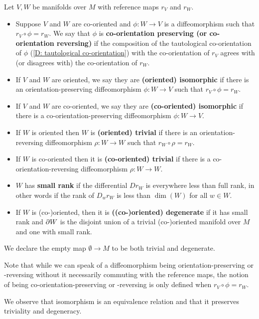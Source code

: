 \begin{definition}\label{D: equiv triv and small}
	Let $V, W$ be manifolds over $M$ with reference maps $r_V$ and $r_W$.
	\begin{itemize}
		\item Suppose $V$ and $W$ are co-oriented and $\phi \colon W \to V$ is a diffeomorphism such that $r_V \circ \phi = r_W$.
		We say that $\phi$ is \textbf{co-orientation preserving (or co-orientation reversing)} if the composition of the tautological co-orientation of $\phi$ (\cref{D: tautological co-orientation}) with the co-orientation of $r_V$ agrees with (or disagrees with) the co-orientation of $r_W$.
		\item If $V$ and $W$ are oriented, we say they are \textbf{(oriented) isomorphic} if there is an orientation-preserving diffeomorphism $\phi \colon W \to V$ such that $r_V \circ \phi = r_W$.
		\item If $V$ and $W$ are co-oriented, we say they are \textbf{(co-oriented) isomorphic} if there is a co-orientation-preserving diffeomorphism $\phi \colon W \to V$.
		\item If $W$ is oriented then $W$ is \textbf{(oriented) trivial} if there is an orientation-reversing diffeomorphism $\rho \colon W \to W$ such that $r_W \circ \rho = r_W$.
		\item If $W$ is co-oriented then it is \textbf{(co-oriented) trivial} if there is a co-orientation-reversing diffeomorphism $\rho \colon W \to W$.
		\item $W$ has \textbf{small rank} if the differential $D r_W$ is everywhere less than full rank, in other words if the rank of $D_w r_W$ is less than $\dim(W)$ for all $w\in W$.
		\item If $W$ is (co\nobreakdash-)oriented, then it is \textbf{((co\nobreakdash-)oriented) degenerate} if it has small rank and ${\partial W}$ is the disjoint union of a trivial (co\nobreakdash-)oriented manifold over $M$ and one with small rank.
	\end{itemize}
	We declare the empty map $\emptyset \to M$ to be both trivial and degenerate.
\end{definition}

Note that while we can speak of a diffeomorphism being orientation-preserving or -reversing without it necessarily commuting with the reference maps, the notion of being co-orientation-preserving or -reversing is only defined when $r_V \circ \phi = r_W$.

We observe that isomorphism is an equivalence relation and that it preserves triviality and degeneracy.

